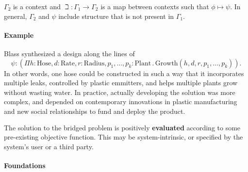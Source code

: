 $\Gamma_2$ is a context and $\beth : \Gamma_1 \rightarrow \Gamma_2$ is
a map between contexts such that $\phi \mapsto \psi$.  In general,
$\Gamma_2$ and $\psi$ include structure that is not present in
$\Gamma_1$.

\paragraph{\textbf{\upshape Example}}
Blass synthesized a design along the lines of $$\psi : (\Pi
h:\mathrm{Hose}, d:\mathrm{Rate}, r:\mathrm{Radius},
p_1,\ldots,p_k:\mathrm{Plant} \mathbin{.}
\mathrm{Growth}(h,d,r,p_1,\ldots,p_k)).$$ In other words, one hose
could be constructed in such a way that it incorporates multiple
leaks, controlled by plastic emmitters, and helps multiple plants grow
without wasting water.  In practice, actually developing the solution
was more complex, and depended on contemporary innovations in plastic
manufacturing and new social relationships to fund and deploy the
product.

\begin{center}
\asterism
\end{center}

\begin{defn}\label{def:result}
\hypertarget{def:result}{}The solution to the bridged problem is positively 
\textbf{evaluated} according to some pre-existing objective function.
This may be system-intrinsic, or specified by the system's user or a third party.
\end{defn}

\paragraph{\textbf{\upshape Foundations}}
                                         
